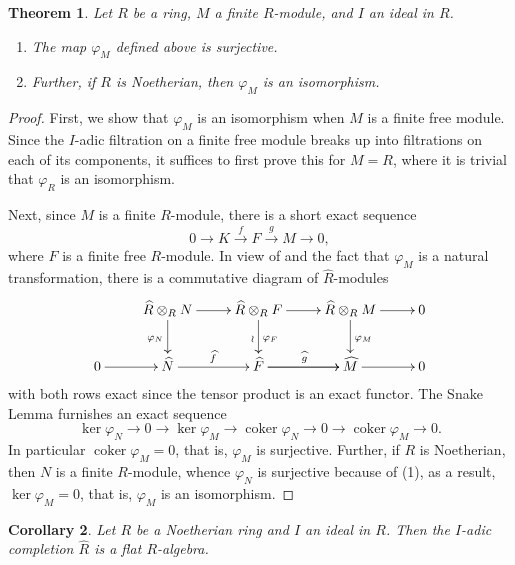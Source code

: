 \documentclass[11pt]{article}
\theoremstyle{thmstyle}
\newtheorem{theorem}{Theorem}[section]
\theoremstyle{defstyle}
\newtheorem{corollary}[theorem]{Corollary}
\newcommand{\coker}{\operatorname{coker}}
\newcommand{\wh}[1]{\widehat{#1}}
\begin{document}
\begin{theorem}
    Let $R$ be a ring, $M$ a finite $R$-module, and $I$ an ideal in $R$. 
    \begin{enumerate}[label=(\arabic*)]
        \item The map $\varphi_M$ defined above is surjective.
        \item Further, if $R$ is Noetherian, then $\varphi_M$ is an isomorphism.
    \end{enumerate}
\end{theorem}
\begin{proof}
    First, we show that $\varphi_M$ is an isomorphism when $M$ is a finite free module. Since the $I$-adic filtration on a finite free module breaks up into filtrations on each of its components, it suffices to first prove this for $M = R$, where it is trivial that $\varphi_R$ is an isomorphism. 

    Next, since $M$ is a finite $R$-module, there is a short exact sequence 
    \begin{equation*}
        0\to K\xrightarrow{f} F\xrightarrow{g} M\to 0,
    \end{equation*}
    where $F$ is a finite free $R$-module. In view of  and the fact that $\varphi_M$ is a natural transformation, there is a commutative diagram of $\wh R$-modules
    \begin{equation*}
        \xymatrix {
            & \wh R\otimes_R N\ar[r]\ar[d]_{\varphi_N} & \wh R\otimes_R F\ar[r]\ar[d]^{\varphi_F}_{\wr} & \wh R\otimes_R M\ar[r]\ar[d]^{\varphi_M} & 0\\
            0\ar[r] & \wh N\ar[r]^{\wh f} & \wh F\ar[r]^{\wh g}\ar[r] & \wh M\ar[r] & 0
        }
    \end{equation*}
    with both rows exact since the tensor product is an exact functor. The Snake Lemma furnishes an exact sequence 
    \begin{equation*}
        \ker\varphi_N\to 0 \to\ker\varphi_M\to\coker\varphi_N\to 0\to\coker\varphi_M\to 0.
    \end{equation*}
    In particular $\coker\varphi_M = 0$, that is, $\varphi_M$ is surjective. Further, if $R$ is Noetherian, then $N$ is a finite $R$-module, whence $\varphi_N$ is surjective because of (1), as a result, $\ker\varphi_M = 0$, that is, $\varphi_M$ is an isomorphism.
\end{proof}

\begin{corollary}
    Let $R$ be a Noetherian ring and $I$ an ideal in $R$. Then the $I$-adic completion $\wh R$ is a flat $R$-algebra.
\end{corollary}
\end{document}
